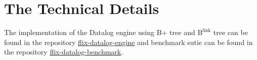 \documentclass[11pt]{report}
\theoremstyle{definition}
\begin{document}

\cleardoublepage
{}




\cleardoublepage
\appendix
\chapter{The Technical Details}

The implementation of the Datalog engine using B+ tree and $\text{B}^{\text{link}}$ tree can be found in the repository \href{https://github.com/wine99/flix-datalog-engine/tree/blinktree}{flix-datalog-engine} and benchmark sutie can be found in the repository \href{https://github.com/wine99/flix-datalog-benchmark}{flix-datalog-benchmark}.
\end{document}
